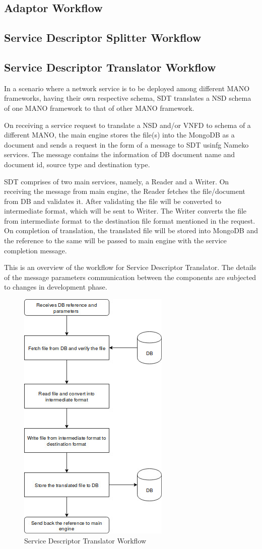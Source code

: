 \subsection{Adaptor Workflow}

\subsection{Service Descriptor Splitter Workflow}

\subsection{Service Descriptor Translator Workflow}
In a scenario where a network service is to be deployed among different MANO frameworks, having their own respective schema, SDT translates a NSD schema of one MANO framework to that of other MANO framework.

On receiving a service request to translate a NSD and/or VNFD to schema of a different MANO, the main engine stores the file(s) into the MongoDB as a document and sends a request in the form of a message to SDT usinfg Nameko services. The message contains the information of DB document name and document id, source type and destination type. 

SDT comprises of two main services, namely, a Reader and a Writer. On receiving the message from main engine, the Reader fetches the file/document from DB and validates it. After validating the file will be converted to intermediate format, which will be sent to Writer. The Writer converts the file from intermediate format to the destination file format mentioned in the request. On completion of translation, the translated file will be stored into MongoDB and the reference to the same will be passed to main engine with the service completion message.

This is an overview of the workflow for Service Descriptor Translator. The details of the message parameters communication between the components are subjected to changes in development phase.


\begin{figure}[H]
	\centering
	\includegraphics[width=0.5\linewidth]{figures/SDT_Workflow}
	\caption{Service Descriptor Translator Workflow}
	\label{fig:SDT Workflow}
\end{figure}

   





